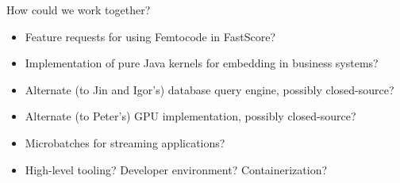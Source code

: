 \documentclass{beamer}
\begin{document}
\begin{frame}{How could we work together?}
\begin{itemize}\setlength{\itemsep}{0.25 cm}
\item Feature requests for using Femtocode in FastScore?
\item Implementation of pure Java kernels for embedding in business systems?
\item Alternate (to Jin and Igor's) database query engine, possibly closed-source?
\item Alternate (to Peter's) GPU implementation, possibly closed-source?
\item Microbatches for streaming applications?
\item High-level tooling? Developer environment? Containerization?
\end{itemize}
\end{frame}
\end{document}
